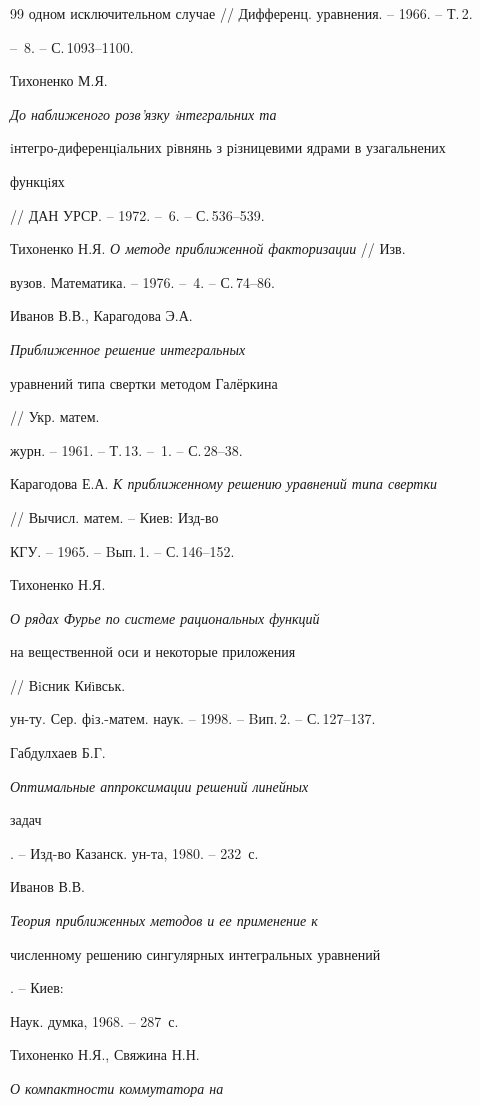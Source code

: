\begin{thebibliography}{99}
{одном исключительном случае} // Дифференц. уравнения. -- 1966. -- Т.\,2.


-- \No\,8. -- С.\,1093--1100. 




Тихоненко М.Я. {\em До наближеного розв'язку iнтегральних та


iнтегро-диференцiальних рiвнянь з рiзницевими ядрами в узагальнених


функцiях} // ДАН УРСР. -- 1972. -- \No\,6. -- С.\,536--539. 




Тихоненко Н.Я. {\em О методе приближенной факторизации} // Изв.


вузов. Математика. -- 1976. -- \No\,4. -- С.\,74--86. 




Иванов В.В., Карагодова Э.А. {\em Приближенное решение интегральных


уравнений типа свертки методом Гал\"еркина} // Укр. матем.


журн. -- 1961. -- Т.\,13. -- \No\,1. -- С.\,28--38.  




Карагодова Е.А. {\em К приближенному решению уравнений типа свертки}


// Вычисл. матем. -- Киев: Изд-во


КГУ. -- 1965. -- Bып.\,1. -- С.\,146--152.




Тихоненко Н.Я. {\em О рядах Фурье по системе рациональных функций


на вещественной оси и некоторые приложения} // Вiсник Ки\"{\i}вськ.


ун-ту. Сер. фiз.-матем. наук. -- 1998. -- Bип.\,2. -- С.\,127--137. 




Габдулхаев Б.Г. {\em Оптимальные аппроксимации решений линейных


задач}. -- Изд-во Казанск. ун-та, 1980. -- 232~с. 




Иванов В.В. {\em Теория приближенных методов и ее применение к


численному решению сингулярных интегральных уравнений}. -- Киев:


Наук. думка, 1968. -- 287~с. 




Тихоненко Н.Я., Свяжина Н.Н. {\em О компактности коммутатора на


}
\end{thebibliography}
